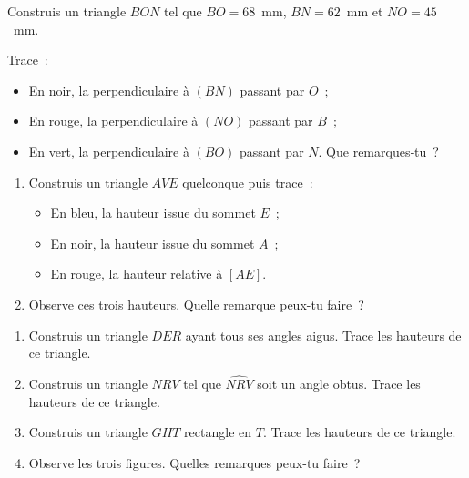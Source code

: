 

\begin{exercice}
Construis un triangle $BON$ tel que $BO = 68$ mm, $BN = 62$ mm et $NO = 45$ mm.

Trace :
\begin{itemize}
 \item En noir, la perpendiculaire à $(BN)$ passant par $O$ ;
 \item En rouge, la perpendiculaire à $(NO)$ passant par $B$ ;
 \item En vert, la perpendiculaire à $(BO)$ passant par $N$. Que remarques‑tu ?
 \end{itemize}
\end{exercice}


\begin{exercice}
\begin{enumerate}
 \item Construis un triangle $AVE$ quelconque puis trace :
 \begin{itemize}
  \item En bleu, la hauteur issue du sommet $E$ ;
  \item En noir, la hauteur issue du sommet $A$ ;
  \item En rouge, la hauteur relative à $[AE]$.
  \end{itemize}
 \item Observe ces trois hauteurs. Quelle remarque peux-tu faire ?
 \end{enumerate}
\end{exercice}


\begin{exercice}
\begin{enumerate}
 \item Construis un triangle $DER$ ayant tous ses angles aigus. Trace les hauteurs de ce triangle.
 \item Construis un triangle $NRV$ tel que $\widehat{NRV}$ soit un angle obtus. Trace les hauteurs de ce triangle.
 \item Construis un triangle $GHT$ rectangle en $T$. Trace les hauteurs de ce triangle.
 \item Observe les trois figures. Quelles remarques peux-tu faire ?
 \end{enumerate}
\end{exercice}


